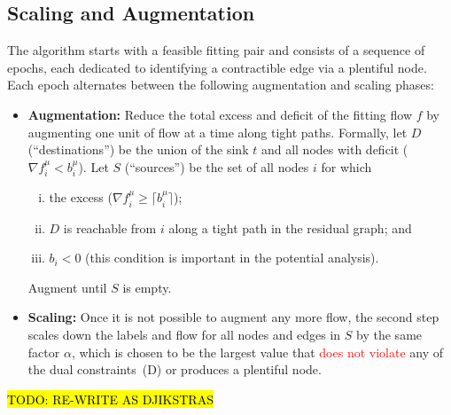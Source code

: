 \documentclass[11pt]{article}
\theoremstyle{definition}
\theoremstyle{definition}
\newcommand{\rewrite}[1]{\textcolor{red}{#1}}
\newcommand{\todo}[1]{\hl{TODO: #1}}
\begin{document}
    \subsection{Scaling and Augmentation}
    \label{sec:sub-ppn}
	The algorithm starts with a feasible fitting pair and consists of a sequence
    of epochs, each dedicated to identifying a contractible edge via a plentiful node.
    Each epoch alternates between the following augmentation and scaling phases:
    \begin{itemize}
    \item \textbf{Augmentation:} Reduce the total excess and deficit of the fitting flow $f$
    by augmenting one unit of flow at a time along tight paths. Formally, let
    $D$ (``destinations'') be the union of the sink $t$ and all nodes with 
    deficit ($\nabla f_i^{\mu} < b_i^{\mu}$). Let $S$ (``sources'') be
    the set of all nodes $i$ for which
    \begin{enumerate}[(i)]
    \item the excess ($\nabla f_i^{\mu} \ge \lceil b_i^{\mu} \rceil$);
    \item $D$ is reachable from $i$ along a tight path in the residual graph; and
    \item $b_i < 0$ (this condition is important in the potential analysis).
    \end{enumerate}
    Augment until $S$ is empty.
    \item \textbf{Scaling:} Once it is not possible to augment any more flow, the second step scales down
    the labels and flow for all nodes and edges in $S$ by the same factor $\alpha$,
    which is chosen to be the largest value that \rewrite{does not violate} any of the dual
    constraints~(D) or produces a plentiful node.
    \end{itemize}

    \todo{RE-WRITE AS DJIKSTRAS}
\end{document}
